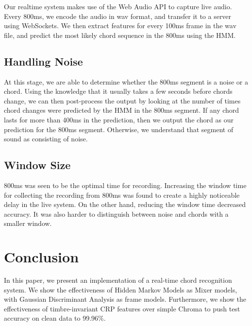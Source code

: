 \documentclass{article}
\begin{document}
Our realtime system makes use of the Web Audio API to capture live audio. Every
800ms, we encode the audio in wav format, and transfer it to a server using
WebSockets. We then extract features for every 100ms frame in the wav file, and
predict the most likely chord sequence in the 800ms using the HMM.

\subsection{Handling Noise}
At this stage, we are able to determine whether the 800ms segment is a noise or
a chord. Using the knowledge that it usually takes a few seconds before chords
change, we can then post-process the output by looking at the number of times
chord changes were predicted by the HMM in the 800ms segment. If any chord lasts
for more than 400ms in the prediction, then we output the chord as our
prediction for the 800ms segment. Otherwise, we understand that segment of sound
as consisting of noise.

\subsection{Window Size}
800ms was seen to be the optimal time for recording. Increasing the window time
for collecting the recording from 800ms was found to create a highly noticeable
delay in the live system. On the other hand, reducing the window time decreased
accuracy. It was also harder to distinguish between noise and chords with a
smaller window.

\section{Conclusion}
In this paper, we present an implementation of a real-time chord recognition
system. We show the effectiveness of Hidden Markov Models as Mixer models, with
Gaussian Discriminant Analysis as frame models. Furthermore, we show the
effectiveness of timbre-invariant CRP features over simple Chroma to push test accuracy on
clean data to 99.96\%.




\end{document}

